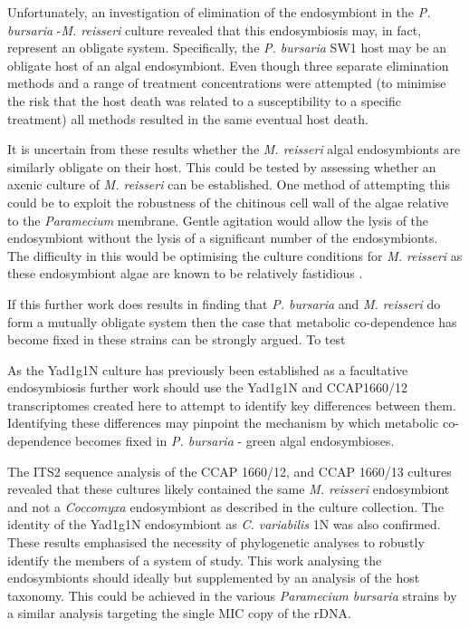 
Unfortunately, an 
investigation of elimination of the endosymbiont in the \textit{P. bursaria}
-\textit{M. reisseri} culture revealed that this endosymbiosis
may, in fact, represent an obligate system. Specifically, the
\textit{P. bursaria} SW1 host may be an obligate host of 
an algal endosymbiont.  Even though three separate elimination methods and
a range of treatment concentrations were attempted (to minimise the 
risk that the host death was related to a susceptibility to a 
specific treatment) all methods resulted in the same eventual host death.

It is uncertain from these results whether 
the \textit{M. reisseri}
algal endosymbionts are similarly obligate on their host.
This could be tested by assessing whether an axenic culture of 
\textit{M. reisseri} can be established. One method
of attempting this could be to 
exploit the robustness of the chitinous cell wall
of the algae relative to the \textit{Paramecium} membrane. Gentle agitation
would allow the lysis of the endosymbiont without the lysis of a significant
number of the endosymbionts.  The difficulty in this would be optimising
the culture conditions for \textit{M. reisseri} 
as these endosymbiont algae are known to be relatively fastidious \citep{Hoshina2009}.

If this further work does results in finding that 
\textit{P. bursaria} and \textit{M. reisseri} do form
a mutually obligate system then 
the case that metabolic co-dependence has become
fixed in these strains can be strongly argued.
To test


As the Yad1g1N culture has previously been established as
a facultative endosymbiosis 
further work should use the Yad1g1N and CCAP1660/12 
transcriptomes created here to attempt to identify key differences 
between them.  Identifying these differences may pinpoint
the mechanism by which metabolic co-dependence becomes fixed in \textit{P. bursaria}
- green algal endosymbioses.


The ITS2 sequence analysis of the CCAP 1660/12,
and CCAP 1660/13 cultures revealed that these cultures likely contained 
the same \textit{M. reisseri} endosymbiont and not a \textit{Coccomyxa}
endosymbiont as described in the culture collection. 
The identity of the Yad1g1N endosymbiont
as \textit{C. variabilis} 1N was also confirmed.
These results emphasised the necessity of phylogenetic
analyses to robustly identify the members of a system of study.
This work analysing the endosymbionts should ideally but supplemented
by an analysis of the host taxonomy. 
This could be achieved in the 
various \textit{Paramecium bursaria} strains by
a similar analysis targeting the single MIC copy of the rDNA.


